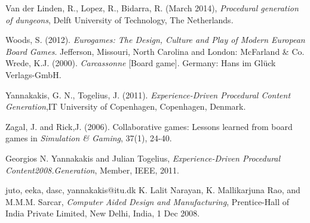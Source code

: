 \documentclass[a4paper,11pt]{article}
\begin{document}
\begin{thebibliography}{1}
Van der Linden, R., Lopez, R., Bidarra, R. (March 2014), \textit{Procedural generation of dungeons}, Delft University of Technology, The Netherlands.

Woods, S. (2012). \textit{Eurogames: The Design, Culture and Play of Modern European Board Games}. Jefferson, Missouri, North Carolina and London: McFarland \& Co.
Wrede, K.J. (2000). \textit{Carcassonne} [Board game]. Germany: Hans im Glück Verlags-GmbH.

Yannakakis, G. N., Togelius, J. (2011). \textit{Experience-Driven Procedural Content Generation},IT University of Copenhagen, Copenhagen, Denmark.

Zagal, J. and Rick,J. (2006). Collaborative games: Lessons learned from board games in \textit{Simulation \& Gaming}, 37(1), 24-40.







Georgios N. Yannakakis and Julian Togelius, \emph{Experience-Driven Procedural Content2008.Generation}, Member, IEEE, 2011.

{juto, eeka, dasc, yannakakis}@itu.dk
K. Lalit Narayan, K. Mallikarjuna Rao, and M.M.M. Sarcar, \emph{Computer Aided Design and Manufacturing}, Prentice-Hall of India Private Limited, New Delhi, India, 1 Dec 2008.

\end{thebibliography}
\end{document}
